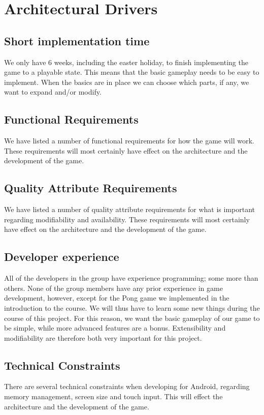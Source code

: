 \section{Architectural Drivers}
\label{sec:architecturaldrivers}

\subsection{Short implementation time}
We only have 6 weeks, including the easter holiday, to finish implementing the
game to a playable state. This means that the basic gameplay needs to be easy
to implement. When the basics are in place we can choose which parts, if any,
we want to expand and/or modify.

\subsection{Functional Requirements}
We have listed a number of functional requirements for how the game will work. These requirements will most certainly have effect on the architecture and the development of the game.

\subsection{Quality Attribute Requirements}
We have listed a number of quality attribute requirements for what is important regarding modifiability and availability. These requirements will most certainly have effect on the architecture and the development of the game. 

\subsection{Developer experience}
All of the developers in the group have experience programming; some more than
others. None of the group members have any prior experience in game
development, however, except for the Pong game we implemented in the
introduction to the course. We will thus have to learn some new things during
the course of this project. For this reason, we want the basic gameplay of our
game to be simple, while more advanced features are a bonus. Extensibility and
modifiability are therefore both very important for this project.


\subsection{Technical Constraints}
There are several technical constraints when developing for Android, regarding memory management, screen size and touch input. This will effect the architecture and the development of the game.

